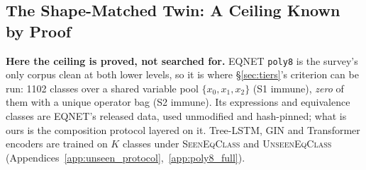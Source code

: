 \subsection{The Shape-Matched Twin: A Ceiling Known by Proof}
\label{sec:structural_scale}
\label{sec:external_audit}

\textbf{Here the ceiling is proved, not searched for.} EQNET \texttt{poly8} is the survey's only corpus clean at both lower levels, so it is where \S\ref{sec:tiers}'s criterion can be run: 1102 classes over a shared variable pool $\{x_0,x_1,x_2\}$ (S1 immune), \emph{zero} of them with a unique operator bag (S2 immune). Its expressions and equivalence classes are EQNET's released data, used unmodified and hash-pinned; what is ours is the composition protocol layered on it. Tree-LSTM, GIN and Transformer encoders are trained on $K$ classes under \textsc{SeenEqClass} and \textsc{UnseenEqClass} (Appendices~\ref{app:unseen_protocol},~\ref{app:poly8_full}).

